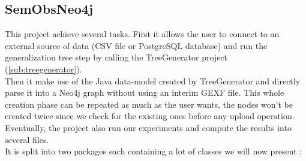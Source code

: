 \subsection{SemObsNeo4j} %
\label{sub:semobsneo4j}
This project achieve several tasks. First it allows the user to connect to an external source of data (CSV file or PostgreSQL database) and run the generalization tree step by calling the TreeGenerator project (\ref{sub:treegenerator}).\\
Then it make use of the Java data-model created by TreeGenerator and directly parse it into a Neo4j graph without using an interim GEXF file. This whole creation phase can be repeated as much as the user wants, the nodes won't be created twice since we check for the existing ones before any upload operation.\\
Eventually, the project also run our experiments and compute the results into several files.\\
It is split into two packages each containing a lot of classes we will now present :
